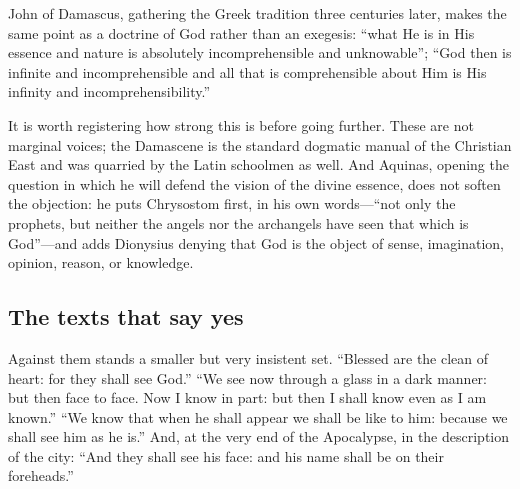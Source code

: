 John of Damascus, gathering the Greek tradition three centuries later, makes the same point as a doctrine of God rather than an exegesis: ``what He is in His essence and nature is absolutely incomprehensible and unknowable''; ``God then is infinite and incomprehensible and all that is comprehensible about Him is His infinity and incomprehensibility.''

It is worth registering how strong this is before going further. These are not marginal voices; the Damascene is the standard dogmatic manual of the Christian East and was quarried by the Latin schoolmen as well. And Aquinas, opening the question in which he will defend the vision of the divine essence, does not soften the objection: he puts Chrysostom first, in his own words---``not only the prophets, but neither the angels nor the archangels have seen that which is God''---and adds Dionysius denying that God is the object of sense, imagination, opinion, reason, or knowledge.

\subsection{The texts that say yes}

Against them stands a smaller but very insistent set. ``Blessed are the clean of heart: for they shall see God.'' ``We see now through a glass in a dark manner: but then face to face. Now I know in part: but then I shall know even as I am known.'' ``We know that when he shall appear we shall be like to him: because we shall see him as he is.'' And, at the very end of the Apocalypse, in the description of the city: ``And they shall see his face: and his name shall be on their foreheads.''


